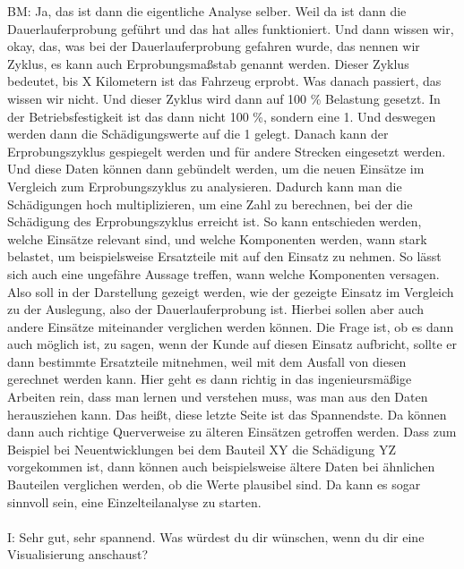 \begin{linenumbers}
BM: Ja, das ist dann die eigentliche Analyse selber. Weil da ist dann die Dauerlauferprobung geführt und das hat alles funktioniert. Und dann wissen wir, okay, das, was bei der Dauerlauferprobung gefahren wurde, das nennen wir Zyklus, es kann auch Erprobungsmaßstab genannt werden. Dieser Zyklus bedeutet, bis X Kilometern ist das Fahrzeug erprobt. Was danach passiert, das wissen wir nicht. Und dieser Zyklus wird dann auf 100 \% Belastung gesetzt. In der Betriebsfestigkeit ist das dann nicht 100 \%, sondern eine 1. Und deswegen werden dann die Schädigungswerte auf die 1 gelegt. Danach kann der Erprobungszyklus gespiegelt werden und für andere Strecken eingesetzt werden. Und diese Daten können dann gebündelt werden, um die neuen Einsätze im Vergleich zum Erprobungszyklus zu analysieren. Dadurch kann man die Schädigungen hoch multiplizieren, um eine Zahl zu berechnen, bei der die Schädigung des Erprobungszyklus erreicht ist. So kann entschieden werden, welche Einsätze relevant sind, und welche Komponenten werden, wann stark belastet, um beispielsweise Ersatzteile mit auf den Einsatz zu nehmen. So lässt sich auch eine ungefähre Aussage treffen, wann welche Komponenten versagen. Also soll in der Darstellung gezeigt werden, wie der gezeigte Einsatz im Vergleich zu der Auslegung, also der Dauerlauferprobung ist. Hierbei sollen aber auch andere Einsätze miteinander verglichen werden können. Die Frage ist, ob es dann auch möglich ist, zu sagen, wenn der Kunde auf diesen Einsatz aufbricht, sollte er dann bestimmte Ersatzteile mitnehmen, weil mit dem Ausfall von diesen gerechnet werden kann. Hier geht es dann richtig in das ingenieursmäßige Arbeiten rein, dass man lernen und verstehen muss, was man aus den Daten herausziehen kann. Das heißt, diese letzte Seite ist das Spannendste. Da können dann auch richtige Querverweise zu älteren Einsätzen getroffen werden. Dass zum Beispiel bei Neuentwicklungen bei dem Bauteil XY die Schädigung YZ vorgekommen ist, dann können auch beispielsweise ältere Daten bei ähnlichen Bauteilen verglichen werden, ob die Werte plausibel sind. Da kann es sogar sinnvoll sein, eine Einzelteilanalyse zu starten. \\\\
I: Sehr gut, sehr spannend. Was würdest du dir wünschen, wenn du dir eine Visualisierung anschaust?\\\\

\end{linenumbers}
